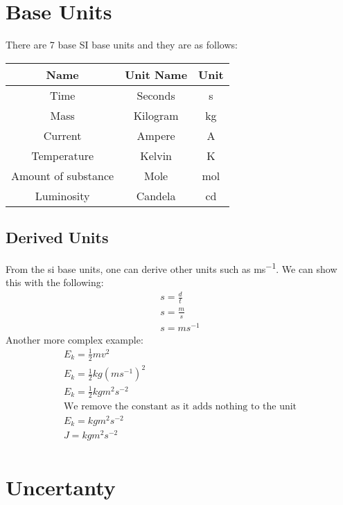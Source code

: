 \documentclass{article}
\begin{document}
\section{Base Units}
There are 7 base SI base units and they are as follows:

\begin{center}
  \begin{tabular}{ | c | c | c | }
    \hline
    Name & Unit Name & Unit \\ \hline
    Time & Seconds & \si{s} \\ \hline
    Mass & Kilogram & \si{kg} \\ \hline
    Current & Ampere & \si{A} \\ \hline
    Temperature & Kelvin & \si{K} \\ \hline
    Amount of substance & Mole & \si{mol} \\ \hline
    Luminosity & Candela & \si{cd} \\
    \hline
  \end{tabular}
\end{center}

\subsection{Derived Units}
From the si base units, one can derive other units such as \si{ms^{-1}}.
We can show this with the following:
\begin{gather*}
	s = \frac{d}{t} \\
	s = \frac{\si{m}}{\si{s}} \\
	s = \si{ms^{-1}}
\end{gather*}
Another more complex example: 
\begin{gather*}
	E_k = \frac{1}{2}mv^2 \\
	E_k = \frac{1}{2}\si{kg} \left (\si{ms^{-1}} \right )^2 \\
	E_k = \frac{1}{2}\si{kgm^{2}s^{-2}} \\
	\text{We remove the constant as it adds nothing to the unit} \\
	E_k = \si{kgm^{2}s^{-2}} \\
	J = \si{kgm^{2}s^{-2}} \\
\end{gather*}

\break

\section{Uncertanty}
\end{document}
